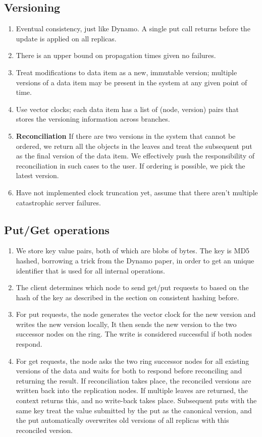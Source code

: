 \documentclass[paper=a4,fontsize=11pt]{report} %
\numberwithin{equation}{section} %
\numberwithin{figure}{section} %
\numberwithin{table}{section} %
\begin{document}
\subsection{Versioning}
\begin{enumerate}
\item Eventual consistency, just like Dynamo. A single put call returns before the update is applied on all replicas.
\item There is an upper bound on propagation times given no failures.
\item Treat modifications to data item as a new, immutable version; multiple versions of a data item may be present in the system at any given point of time.
\item Use vector clocks; each data item has a list of (node, version) pairs that stores the versioning information across branches.
\item \textbf{Reconciliation} If there are two versions in the system that cannot be ordered, we return all the objects in the leaves and treat the subsequent put as the final version of the data item. We effectively push the responsibility of reconciliation in such cases to the user. If ordering is possible, we pick the latest version.
\item Have not implemented clock truncation yet, assume that there aren't multiple catastrophic server failures.
\end{enumerate}

\subsection{Put/Get operations}
\begin{enumerate}
\item We store key value pairs, both of which are blobs of bytes. The key is MD5 hashed, borrowing a trick from the Dynamo paper, in order to get an unique identifier that is used for all internal operations.
\item The client determines which node to send get/put requests to based on the hash of the key as described in the section on consistent hashing before.
\item For put requests, the node generates the vector clock for the new version and writes the new version locally, It then sends the new version to the two successor nodes on the ring. The write is considered successful if both nodes respond.
\item For get requests, the node asks the two ring successor nodes for all existing versions of the data and waits for both to respond before reconciling and returning the result. If reconciliation takes place, the reconciled versions are written back into the replication nodes. If multiple leaves are returned, the context returns this, and no write-back takes place. Subsequent puts with the same key treat the value submitted by the put as the canonical version, and the put automatically overwrites old versions of all replicas with this reconciled version.
\end{enumerate}
\end{document}
